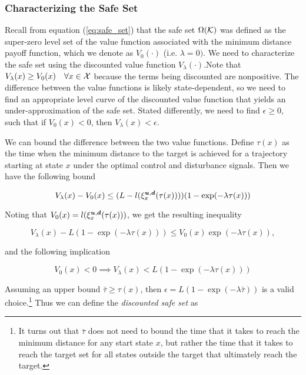 \documentclass[letterpaper, 10 pt, conference]{ieeeconf}
\begin{document}
\subsubsection{Characterizing the Safe Set}

Recall from equation (\ref{eq:safe_set}) that the safe set $\Omega(\mathcal{K})$ was defined as the super-zero level set of the value function associated with the minimum distance payoff function, which we denote as  $V_0(\cdot)$ (i.e. $\lambda = 0)$. We need to characterize the safe set using the discounted value function $V_{\lambda}(\cdot)$.Note that $V_{\lambda}(x) \geq V_0(x) \quad \forall x\in \mathcal{X}$ because the terms being discounted are nonpositive. The difference between the value functions is likely state-dependent, so we need to find an appropriate level curve of the discounted value function that yields an under-approximation of the safe set. Stated differently, we need to find $\epsilon \geq 0$, such that if $V_0(x)<0$, then $V_\lambda(x)<\epsilon$. 

We can bound the difference between the two value functions.  Define $\tau(x)$ as the time when the minimum distance to the target is achieved for a trajectory starting at state $x$ under the optimal control and disturbance signals. Then we have the following bound

\begin{equation}
V_{\lambda}(x) - V_0(x)  \leq (L - l(\xi_{x}^{\bm{u},\bm{d}}(\tau(x))))( 1 -  \exp(-\lambda \tau(x))) 
\end{equation}

Noting that $V_0(x)=l(\xi_{x}^{\bm{u},\bm{d}}(\tau(x)))$, we get the resulting inequality

\begin{equation}
V_{\lambda}(x) -  L( 1 -  \exp(-\lambda \tau(x))) \leq V_0(x) \exp(-\lambda \tau(x)), 
\end{equation}

\noindent and the following implication

\begin{equation}
V_0(x)<0 \implies V_{\lambda}(x) <  L( 1 -  \exp(-\lambda \tau(x)))
\end{equation}

Assuming an upper bound  $\bar{\tau} \geq \tau(x)$, then $\epsilon = L( 1 -  \exp(-\lambda \bar{\tau}))$ is a valid choice.\footnote{It turns out that $\bar{\tau}$ does not need to bound the time that it takes to reach the minimum distance for any start state $x$, but rather the time that it takes to reach the target set for all states outside the target that ultimately reach the target.} Thus we can define the \emph{discounted safe set} as 
\end{document}
